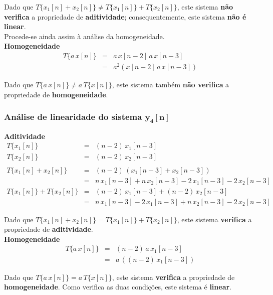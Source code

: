 \documentclass[a4paper]{article}
\begin{document}
\noindent Dado que $T\{x_{1}[n] + x_{2}[n]\} \neq T\{x_{1}[n]\} + T\{x_{2}[n]\}$, este sistema \textbf{não verifica} a propriedade de \textbf{aditividade}; consequentemente, este sistema \textbf{não é linear}. \\
Procede-se ainda assim à análise da homogeneidade. \\

\noindent \textbf{Homogeneidade}
\begin{eqnarray}
	T\{a \, x[n]\}					& = & a \, x[n - 2] \, a \, x[n - 3] \\
									& = & a^2 (x[n - 2] \, a \, x[n - 3])
\end{eqnarray}

\noindent Dado que $T\{a \, x[n]\} \neq a \, T\{x[n]\}$, este sistema também \textbf{não verifica} a propriedade de \textbf{homogeneidade}.

\subsubsection{Análise de linearidade do sistema $\mathbf{y_{4}[n]}$}
\noindent \textbf{Aditividade}
\begin{eqnarray}
	T\{x_{1}[n]\}					& = & (n - 2) \, x_{1}[n - 3] \\
	T\{x_{2}[n]\}					& = & (n - 2) \, x_{2}[n - 3] \\
	\nonumber \\
	T\{x_{1}[n] + x_{2}[n]\}		& = & (n - 2) \, (x_{1}[n - 3] + x_{2}[n - 3]) \\
									& = & n \, x_{1}[n - 3] + n \, x_{2}[n - 3] - 2 \, x_{1}[n - 3] - 2 \, x_{2}[n - 3] \\
	T\{x_{1}[n]\} + T\{x_{2}[n]\}	& = & (n - 2) \, x_{1}[n - 3] + (n - 2) \, x_{2}[n - 3] \\
									& = & n \, x_{1}[n - 3] - 2 \, x_{1}[n - 3] + n \, x_{2}[n - 3] - 2 \, x_{2}[n - 3]
\end{eqnarray}

\noindent Dado que $T\{x_{1}[n] + x_{2}[n]\} = T\{x_{1}[n]\} + T\{x_{2}[n]\}$, este sistema \textbf{verifica} a propriedade de \textbf{aditividade}. \\

\noindent \textbf{Homogeneidade}
\begin{eqnarray}
	T\{a \, x[n]\}					& = & (n - 2) \, a \, x_{1}[n - 3] \\
									& = & a \, ((n - 2) \, x_{1}[n - 3])
\end{eqnarray}

\noindent Dado que $T\{a \, x[n]\} = a \, T\{x[n]\}$, este sistema \textbf{verifica} a propriedade de \textbf{homogeneidade}. Como verifica as duas condições, este sistema é \textbf{linear}.
\end{document}

